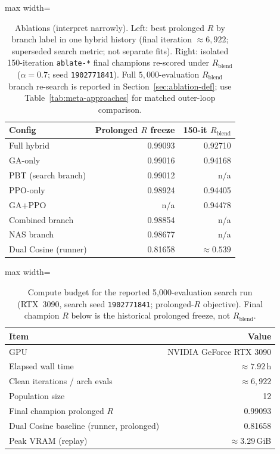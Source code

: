 \begin{table}[htbp]
  \centering
  \caption{Ablations (interpret narrowly).
    Left: best prolonged $R$ by branch label in one hybrid history (final iteration ${\approx}6{,}922$; superseded search metric; not separate fits).
    Right: isolated 150-iteration \texttt{ablate-*} final champions re-scored under $R_{\mathrm{blend}}$ ($\alpha{=}0.7$; seed \texttt{1902771841}).
    Full $5{,}000$-evaluation $R_{\mathrm{blend}}$ branch re-search is reported in Section~\ref{sec:ablation-def}; use Table~\ref{tab:meta-approaches} for matched outer-loop comparison.}
  \label{tab:ablation}
  \setlength{\tabcolsep}{3pt}
  \begin{adjustbox}{max width=\columnwidth}
  \begin{tabular}{@{}lrr@{}}
    \toprule
    Config & Prolonged $R$ freeze & 150-it $R_{\mathrm{blend}}$ \\
    \midrule
    Full hybrid & 0.99093 & 0.92710 \\
    GA-only & 0.99016 & 0.94168 \\
    PBT (search branch) & 0.99012 & n/a \\
    PPO-only & 0.98924 & 0.94405 \\
    GA+PPO & n/a & 0.94478 \\
    Combined branch & 0.98854 & n/a \\
    NAS branch & 0.98677 & n/a \\
    Dual Cosine (runner) & 0.81658 & ${\approx}0.539$ \\
    \bottomrule
  \end{tabular}
\end{adjustbox}
\end{table}

\begin{table}[htbp]
  \centering
  \caption{Compute budget for the reported 5,000-evaluation search run (RTX~3090, search seed \texttt{1902771841}; prolonged-$R$ objective).
    Final champion $R$ below is the historical prolonged freeze, not $R_{\mathrm{blend}}$.}
  \label{tab:compute}
  \setlength{\tabcolsep}{3pt}
  \begin{adjustbox}{max width=\columnwidth}
\begin{tabular}{@{}lr@{}}
    \toprule
    Item & Value \\
    \midrule
    GPU & NVIDIA GeForce RTX 3090 \\
    Elapsed wall time & ${\approx}7.92$\,h \\
    Clean iterations / arch evals & ${\approx}6{,}922$ \\
    Population size & 12 \\
    Final champion prolonged $R$ & 0.99093 \\
    Dual Cosine baseline (runner, prolonged) & 0.81658 \\
    Peak VRAM (replay) & ${\approx}3.29$\,GiB \\
    \bottomrule
  \end{tabular}
\end{adjustbox}
\end{table}

